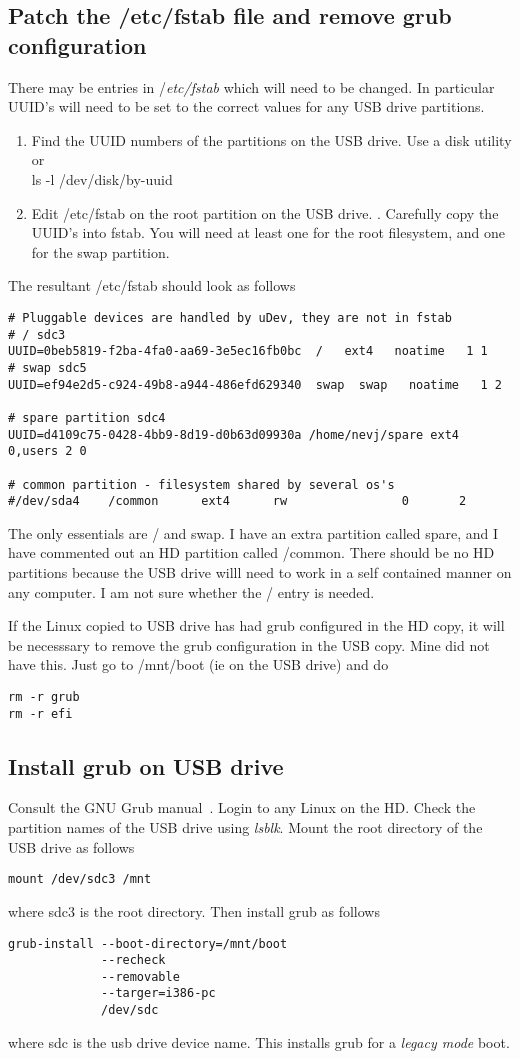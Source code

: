 \documentclass{article}  %
\begin{document}
\subsection{Patch the /etc/fstab file and remove grub configuration}
There may be entries in {/\em etc/fstab} which will need to be changed. In particular UUID's will need to be set to the correct values for any USB drive partitions. 
\begin{enumerate}
\item Find the UUID numbers of the partitions on the USB drive. Use a disk utility or \\
  ls -l /dev/disk/by-uuid
\item Edit /etc/fstab on the root partition on the USB drive. . Carefully copy the UUID's into fstab. You will need at least one for the root filesystem, and one for the swap partition.
\end{enumerate}
 The resultant /etc/fstab should look as follows
\begin{verbatim}
# Pluggable devices are handled by uDev, they are not in fstab
# / sdc3
UUID=0beb5819-f2ba-4fa0-aa69-3e5ec16fb0bc  /   ext4   noatime   1 1 
# swap sdc5
UUID=ef94e2d5-c924-49b8-a944-486efd629340  swap  swap   noatime   1 2 

# spare partition sdc4
UUID=d4109c75-0428-4bb9-8d19-d0b63d09930a /home/nevj/spare ext4 0,users 2 0 

# common partition - filesystem shared by several os's
#/dev/sda4    /common      ext4      rw                0       2
\end{verbatim}
The only essentials are / and swap. I have an extra partition called spare, and I have commented out an HD partition called /common. There should be no HD partitions because the USB drive willl need to work in a self contained manner on any computer. I am not sure whether the / entry is needed.

If the Linux copied to USB drive has had grub configured in the HD copy, it will be necesssary to remove the grub configuration in the USB copy. Mine did not have this. Just go to /mnt/boot (ie on the USB drive) and do 
\begin{verbatim}
rm -r grub
rm -r efi
\end{verbatim}

\subsection{Install grub on USB drive}
Consult the GNU Grub manual~\cite{gnu:21}.
Login to any Linux on the HD.  Check the partition names of the USB drive using {\em lsblk}. Mount the root directory of the USB drive as follows
\begin{verbatim}
mount /dev/sdc3 /mnt
\end{verbatim} 
where sdc3 is the root directory. Then install grub as follows
\begin{verbatim}
grub-install --boot-directory=/mnt/boot 
             --recheck 
             --removable 
             --targer=i386-pc 
             /dev/sdc
\end{verbatim}
where sdc is the usb drive device name. 
This installs grub for a {\em legacy mode} boot.
\end{document}
